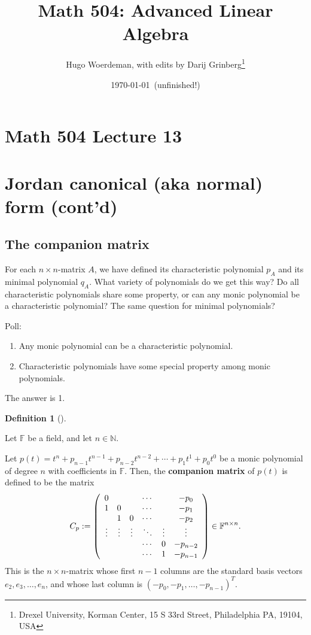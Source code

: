 \documentclass[numbers=enddot,12pt,final,onecolumn,notitlepage]{scrartcl}%
\numberwithin{exer}{subsection}
\theoremstyle{definition}
\newtheorem{defi}[theo]{Definition}
\newenvironment{definition}[1][]
{\begin{defi}[#1]\begin{leftbar}}
{\end{leftbar}\end{defi}}
\begin{document}
\title{Math 504: Advanced Linear Algebra}
\author{Hugo Woerdeman, with edits by Darij Grinberg\thanks{Drexel University, Korman
Center, 15 S 33rd Street, Philadelphia PA, 19104, USA}}
\date{\today\ (unfinished!)}
\maketitle
\tableofcontents

\section*{Math 504 Lecture 13}

\section{Jordan canonical (aka normal) form (cont'd)}

\subsection{The companion matrix}

For each $n\times n$-matrix $A$, we have defined its characteristic polynomial
$p_{A}$ and its minimal polynomial $q_{A}$. What variety of polynomials do we
get this way? Do all characteristic polynomials share some property, or can
any monic polynomial be a characteristic polynomial? The same question for
minimal polynomials?

Poll:

\begin{enumerate}
\item Any monic polynomial can be a characteristic polynomial.

\item Characteristic polynomials have some special property among monic polynomials.
\end{enumerate}

The answer is 1.

\begin{definition}
Let $\mathbb{F}$ be a field, and let $n\in\mathbb{N}$.

Let $p\left(  t\right)  =t^{n}+p_{n-1}t^{n-1}+p_{n-2}t^{n-2}+\cdots+p_{1}%
t^{1}+p_{0}t^{0}$ be a monic polynomial of degree $n$ with coefficients in
$\mathbb{F}$. Then, the \textbf{companion matrix} of $p\left(  t\right)  $ is
defined to be the matrix%
\[
C_{p}:=\left(
\begin{array}
[c]{cccccc}%
0 &  &  & \cdots &  & -p_{0}\\
1 & 0 &  & \cdots &  & -p_{1}\\
& 1 & 0 & \cdots &  & -p_{2}\\
\vdots & \vdots & \vdots & \ddots & \vdots & \vdots\\
&  &  & \cdots & 0 & -p_{n-2}\\
&  &  & \cdots & 1 & -p_{n-1}%
\end{array}
\right)  \in\mathbb{F}^{n\times n}.
\]
This is the $n\times n$-matrix whose first $n-1$ columns are the standard
basis vectors $e_{2},e_{3},\ldots,e_{n}$, and whose last column is $\left(
-p_{0},-p_{1},\ldots,-p_{n-1}\right)  ^{T}$.
\end{definition}
\end{document}

